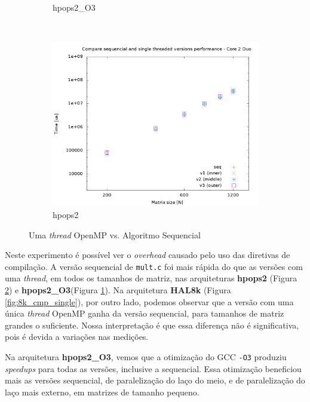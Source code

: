 \documentclass[a4paper, 12pt]{article}
\begin{document}
\begin{figure}[H]
\begin{subfigure}[H]{0.5\textwidth}
        \caption{hpops2\_O3}
        \label{fig:hpops2_O3_cmp_single}
    \end{subfigure}
    ~ %
    \begin{subfigure}[H]{0.5\textwidth}
        \includegraphics[width=\textwidth]{cmp_single_thread_hpops2}
        \caption{hpops2}
        \label{fig:hpops2_cmp_single}
    \end{subfigure}
    \caption{Uma \textit{thread} OpenMP vs. Algoritmo Sequencial}\label{fig:single_vs_openmp}
\end{figure}

Neste experimento é possível ver o \textit{overhead} causado pelo uso das
diretivas de compilação. A versão sequencial de \texttt{mult.c} foi mais rápida
do que as versões com uma \textit{thread}, em todos os tamanhos de matriz, nas
arquiteturas \textbf{hpops2} (Figura \ref{fig:hpops2_cmp_single}) e
\textbf{hpops2\_O3}(Figura \ref{fig:hpops2_O3_cmp_single}). Na arquitetura
\textbf{HAL8k} (Figura \ref{fig:8k_cmp_single}), por outro lado, podemos
observar que a versão com uma única \textit{thread} OpenMP ganha da
versão sequencial, para tamanhos de matriz grandes o suficiente. Nossa
interpretação é que essa diferença não é significativa, pois é devida a
variações nas medições.

Na arquitetura \textbf{hpops2\_O3}, vemos que a otimização do GCC \texttt{-O3}
produziu \textit{speedups} para todas as versões, inclusive a sequencial.
Essa otimização beneficiou mais as versões sequencial, de paralelização do
laço do meio, e de paralelização do laço mais externo, em matrizes de tamanho
pequeno.
\end{document}
